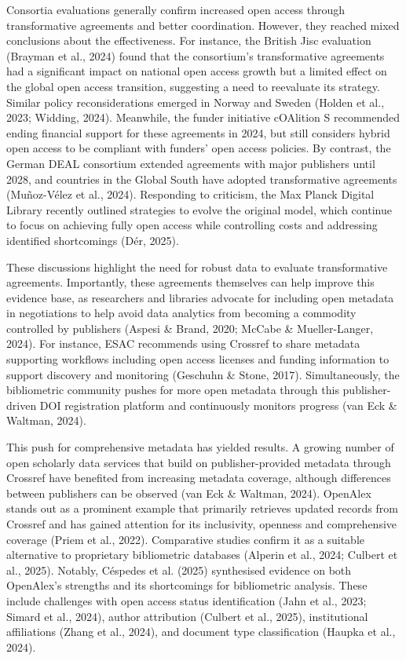 \documentclass[a4paper,man,floatsintext,longtable,noextraspace,10pt]{apa6}
\begin{document}
Consortia evaluations generally confirm increased open access through
transformative agreements and better coordination. However, they reached
mixed conclusions about the effectiveness. For instance, the British
Jisc evaluation (Brayman et al., 2024) found that the consortium's
transformative agreements had a significant impact on national open
access growth but a limited effect on the global open access transition,
suggesting a need to reevaluate its strategy. Similar policy
reconsiderations emerged in Norway and Sweden (Holden et al., 2023;
Widding, 2024). Meanwhile, the funder initiative cOAlition S recommended
ending financial support for these agreements in 2024, but still
considers hybrid open access to be compliant with funders' open access
policies. By contrast, the German DEAL consortium extended agreements
with major publishers until 2028, and countries in the Global South have
adopted transformative agreements (Muñoz-Vélez et al., 2024). Responding
to criticism, the Max Planck Digital Library recently outlined
strategies to evolve the original model, which continue to focus on
achieving fully open access while controlling costs and addressing
identified shortcomings (Dér, 2025).

These discussions highlight the need for robust data to evaluate
transformative agreements. Importantly, these agreements themselves can
help improve this evidence base, as researchers and libraries advocate
for including open metadata in negotiations to help avoid data analytics
from becoming a commodity controlled by publishers (Aspesi \& Brand,
2020; McCabe \& Mueller-Langer, 2024). For instance, ESAC recommends
using Crossref to share metadata supporting workflows including open
access licenses and funding information to support discovery and
monitoring (Geschuhn \& Stone, 2017). Simultaneously, the bibliometric
community pushes for more open metadata through this publisher-driven
DOI registration platform and continuously monitors progress (van Eck \&
Waltman, 2024).

This push for comprehensive metadata has yielded results. A growing
number of open scholarly data services that build on publisher-provided
metadata through Crossref have benefited from increasing metadata
coverage, although differences between publishers can be observed (van
Eck \& Waltman, 2024). OpenAlex stands out as a prominent example that
primarily retrieves updated records from Crossref and has gained
attention for its inclusivity, openness and comprehensive coverage
(Priem et al., 2022). Comparative studies confirm it as a suitable
alternative to proprietary bibliometric databases (Alperin et al., 2024;
Culbert et al., 2025). Notably, Céspedes et al. (2025) synthesised
evidence on both OpenAlex's strengths and its shortcomings for
bibliometric analysis. These include challenges with open access status
identification (Jahn et al., 2023; Simard et al., 2024), author
attribution (Culbert et al., 2025), institutional affiliations (Zhang et
al., 2024), and document type classification (Haupka et al., 2024).
\end{document}
